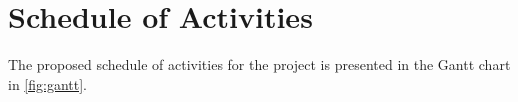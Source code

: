 \documentclass[english, a4paper, 11pt]{article}
\begin{document}
\section{Schedule of Activities}

The proposed schedule of activities for the project is presented in the Gantt chart in \cref{fig:gantt}.

\newpage
\end{document}
